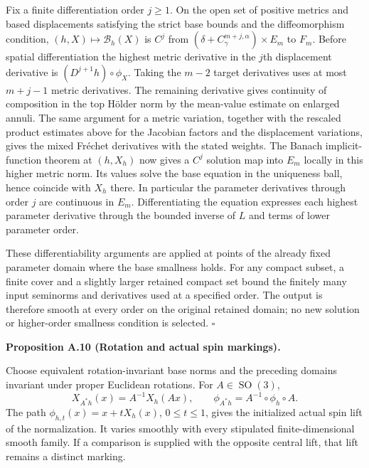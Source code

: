 \documentclass[
  english,
  11pt,
  reqno]{amsart}
\makeatletter
\newcommand{\pandocstatementheading}[1]{%
  \par\if@nobreak\else
    \addpenalty{\@beginparpenalty}%
    \addvspace{.5\baselineskip plus .2\baselineskip minus .2\baselineskip}%
  \fi
  {\normalfont\bfseries #1\par}%
  \nobreak\@afterindenttrue\@afterheading
}
\makeatother
\begin{document}
Fix a finite differentiation order \(j\ge1\). On the open set of
positive metrics and based displacements satisfying the strict base
bounds and the diffeomorphism condition, \((h,X)\mapsto\mathcal B_h(X)\)
is \(C^j\) from \((\delta+C_\gamma^{m+j,\alpha})\times E_m\) to \(F_m\).
Before spatial differentiation the highest metric derivative in the
\(j\)th displacement derivative is \((D^{j+1}h)\circ\phi_X\). Taking the
\(m-2\) target derivatives uses at most \(m+j-1\) metric derivatives.
The remaining derivative gives continuity of composition in the top
Hölder norm by the mean-value estimate on enlarged annuli. The same
argument for a metric variation, together with the rescaled product
estimates above for the Jacobian factors and the displacement
variations, gives the mixed Fréchet derivatives with the stated weights.
The Banach implicit-function theorem at \((h,X_h)\) now gives a \(C^j\)
solution map into \(E_m\) locally in this higher metric norm. Its values
solve the base equation in the uniqueness ball, hence coincide with
\(X_h\) there. In particular the parameter derivatives through order
\(j\) are continuous in \(E_m\). Differentiating the equation expresses
each highest parameter derivative through the bounded inverse of \(L\)
and terms of lower parameter order.

These differentiability arguments are applied at points of the already
fixed parameter domain where the base smallness holds. For any compact
subset, a finite cover and a slightly larger retained compact set bound
the finitely many input seminorms and derivatives used at a specified
order. The output is therefore smooth at every order on the original
retained domain; no new solution or higher-order smallness condition is
selected. \hfill\(\square\)

\pandocstatementheading{\leavevmode{}\label{prop:online-gauge-rotation-and-spin}Proposition A.10 (Rotation and actual spin markings).}

Choose equivalent rotation-invariant base norms and the preceding
domains invariant under proper Euclidean rotations. For
\(A\in\operatorname{SO}(3)\),%
 \[
X_{A^*h}(x)=A^{-1}X_h(Ax),
\qquad
\phi_{A^*h}=A^{-1}\circ\phi_h\circ A.
\] The path \(\phi_{h,t}(x)=x+tX_h(x)\), \(0\le t\le1\), gives the
initialized actual spin lift of the normalization. It varies smoothly
with every stipulated finite-dimensional smooth family. If a comparison
is supplied with the opposite central lift, that lift remains a distinct
marking.
\end{document}
